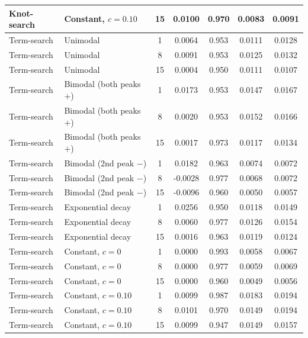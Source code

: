 \documentclass{article}
\begin{document}
\begin{table}[ht]
\begin{tabular}{l l c c c c c}
Knot-search & Constant, $c=0.10$ & 15 & 0.0100 & 0.970 & 0.0083 & 0.0091 \\
\midrule
Term-search & Unimodal & 1 & 0.0064 & 0.953 & 0.0111 & 0.0128 \\
Term-search & Unimodal & 8 & 0.0091 & 0.953 & 0.0125 & 0.0132 \\
Term-search & Unimodal & 15 & 0.0004 & 0.950 & 0.0111 & 0.0107 \\
Term-search & Bimodal (both peaks $+$) & 1 & 0.0173 & 0.953 & 0.0147 & 0.0167 \\
Term-search & Bimodal (both peaks $+$) & 8 & 0.0020 & 0.953 & 0.0152 & 0.0166 \\
Term-search & Bimodal (both peaks $+$) & 15 & 0.0017 & 0.973 & 0.0117 & 0.0134 \\
Term-search & Bimodal (2nd peak $-$) & 1 & 0.0182 & 0.963 & 0.0074 & 0.0072 \\
Term-search & Bimodal (2nd peak $-$) & 8 & -0.0028 & 0.977 & 0.0068 & 0.0072 \\
Term-search & Bimodal (2nd peak $-$) & 15 & -0.0096 & 0.960 & 0.0050 & 0.0057 \\
Term-search & Exponential decay & 1 & 0.0256 & 0.950 & 0.0118 & 0.0149 \\
Term-search & Exponential decay & 8 & 0.0060 & 0.977 & 0.0126 & 0.0154 \\
Term-search & Exponential decay & 15 & 0.0016 & 0.963 & 0.0119 & 0.0124 \\
Term-search & Constant, $c=0$ & 1 & 0.0000 & 0.993 & 0.0058 & 0.0067 \\
Term-search & Constant, $c=0$ & 8 & 0.0000 & 0.977 & 0.0059 & 0.0069 \\
Term-search & Constant, $c=0$ & 15 & 0.0000 & 0.960 & 0.0049 & 0.0056 \\
Term-search & Constant, $c=0.10$ & 1 & 0.0099 & 0.987 & 0.0183 & 0.0194 \\
Term-search & Constant, $c=0.10$ & 8 & 0.0101 & 0.970 & 0.0149 & 0.0194 \\
Term-search & Constant, $c=0.10$ & 15 & 0.0099 & 0.947 & 0.0149 & 0.0157 \\
\bottomrule
\end{tabular}
\end{table}
\end{document}
